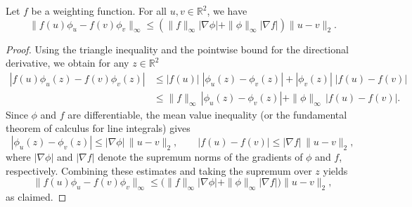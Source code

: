 \documentclass[10pt,a4paper]{amsart}
\newcommand{\R}{\mathbb{R}}
\begin{document}
\begin{lemma}\label{lem:wf}
Let \( f \) be a weighting function. For all \( u, v \in \R^2 \), we have
\[
\| f(u)\phi_u - f(v)\phi_v \|_{\infty} \leq \left( \|f\|_{\infty} |\nabla \phi| + \|\phi\|_{\infty} |\nabla f| \right) \|u - v\|_2.
\]
\end{lemma}

\begin{proof}
Using the triangle inequality and the pointwise bound for the directional derivative, we obtain for any $z\in\mathbb{R}^2$
\begin{align*}
    |f(u)\phi_u(z)-f(v)\phi_v(z)|
    &\le |f(u)|\;|\phi_u(z)-\phi_v(z)|+|\phi_v(z)|\;|f(u)-f(v)| \\
    &\le \|f\|_{\infty}\,|\phi_u(z)-\phi_v(z)|+\|\phi\|_{\infty}\,|f(u)-f(v)|.
\end{align*}
Since $\phi$ and $f$ are differentiable, the mean value inequality (or the fundamental theorem of calculus for line integrals) gives
\[
|\phi_u(z)-\phi_v(z)| \le |\nabla\phi|\,\|u-v\|_2,\qquad
|f(u)-f(v)| \le |\nabla f|\,\|u-v\|_2,
\]
where $|\nabla\phi|$ and $|\nabla f|$ denote the supremum norms of the gradients of $\phi$ and $f$, respectively. Combining these estimates and taking the supremum over $z$ yields
\[
\|f(u)\phi_u-f(v)\phi_v\|_{\infty}
\le \big(\|f\|_{\infty}|\nabla\phi|+\|\phi\|_{\infty}|\nabla f|\big)\|u-v\|_2,
\]
as claimed.
\end{proof}
\end{document}

